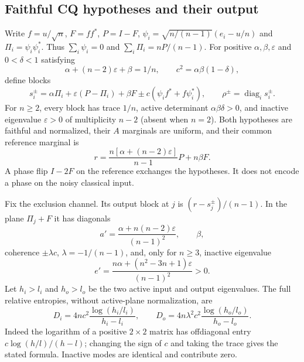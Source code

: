 \documentclass[11pt]{article}
\theoremstyle{remark}\newtheorem{remark}[theorem]{Remark}
\newcommand{\diag}{\operatorname{diag}}
\newcommand{\eps}{\varepsilon}
\begin{document}
\subsection{Faithful CQ hypotheses and their output}
Write $f=u/\sqrt n$, $F=ff^*$, $P=I-F$,
$\psi_i=\sqrt{n/(n-1)}(e_i-u/n)$ and $\Pi_i=\psi_i\psi_i^*$. Thus $\sum_i\psi_i=0$ and $\sum_i\Pi_i=nP/(n-1)$. For positive $\alpha,\beta,\eps$ and $0<\delta<1$ satisfying
\[
 \alpha+(n-2)\eps+\beta=1/n,
 \qquad c^2=\alpha\beta(1-\delta),
\]
define blocks
\begin{equation}\label{eq:blocks}
 s_i^\pm=\alpha\Pi_i+\eps(P-\Pi_i)+\beta F
 \pm c(\psi_if^*+f\psi_i^*),\qquad \rho^\pm=\diag_i s_i^\pm.
\end{equation}
For $n\geq2$, every block has trace $1/n$, active determinant $\alpha\beta\delta>0$, and inactive eigenvalue $\eps>0$ of multiplicity $n-2$ (absent when $n=2$). Both hypotheses are faithful and normalized, their $A$ marginals are uniform, and their common reference marginal is
\[
 r=\frac{n[\alpha+(n-2)\eps]}{n-1}P+n\beta F.
\]
A phase flip $I-2F$ on the reference exchanges the hypotheses. It does not encode a phase on the noisy classical input.

Fix the exclusion channel. Its output block at $j$ is $(r-s_j^\pm)/(n-1)$. In the plane $\Pi_j+F$ it has diagonals
\[
 a'=\frac{\alpha+n(n-2)\eps}{(n-1)^2},\qquad\beta,
\]
coherence $\pm\lambda c$, $\lambda=-1/(n-1)$, and, only for $n\geq3$, inactive eigenvalue
\[
 e'=\frac{n\alpha+(n^2-3n+1)\eps}{(n-1)^2}>0.
\]
Let $h_i>l_i$ and $h_o>l_o$ be the two active input and output eigenvalues. The full relative entropies, without active-plane normalization, are
\begin{equation}\label{eq:finiteD}
 D_i=4nc^2\frac{\log(h_i/l_i)}{h_i-l_i},\qquad
 D_o=4n\lambda^2c^2\frac{\log(h_o/l_o)}{h_o-l_o}.
\end{equation}
Indeed the logarithm of a positive $2\times2$ matrix has offdiagonal entry $c\log(h/l)/(h-l)$; changing the sign of $c$ and taking the trace gives the stated formula. Inactive modes are identical and contribute zero.
\end{document}
